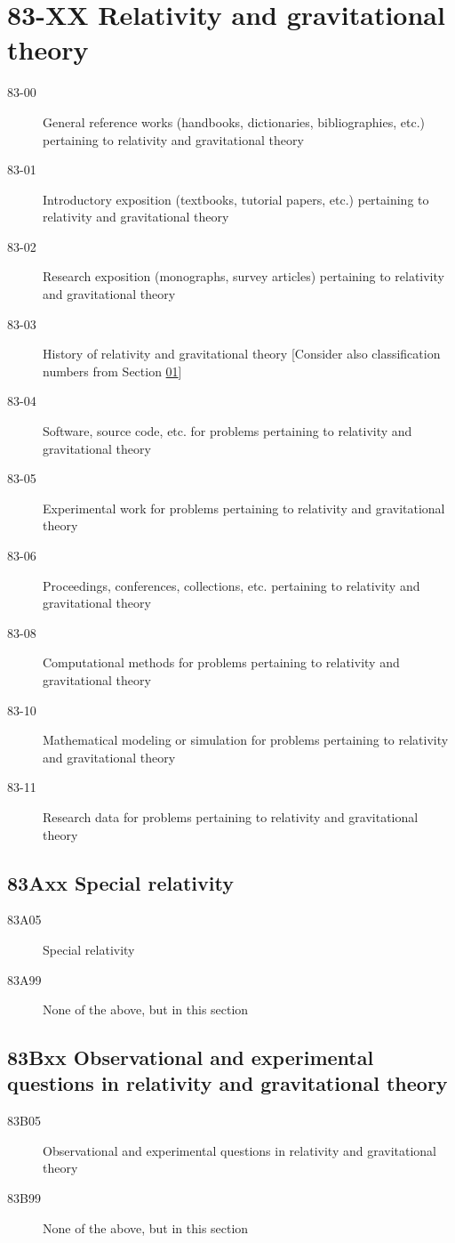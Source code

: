 \section*{83-XX Relativity and gravitational theory }\label{83-XX}
\begin{description}
\item [83-00]\label{83-00} General reference works (handbooks, dictionaries, bibliographies, etc.) pertaining to relativity and gravitational theory
\item [83-01]\label{83-01} Introductory exposition (textbooks, tutorial papers, etc.) pertaining to relativity and gravitational theory
\item [83-02]\label{83-02} Research exposition (monographs, survey articles) pertaining to relativity and gravitational theory
\item [83-03]\label{83-03} History of relativity and gravitational theory [Consider also classification numbers from Section \hyperref[01-XX]{01}]
\item [83-04]\label{83-04} Software, source code, etc. for problems pertaining to relativity and gravitational theory
\item [83-05]\label{83-05} Experimental work for problems pertaining to relativity and gravitational theory
\item [83-06]\label{83-06} Proceedings, conferences, collections, etc. pertaining to relativity and gravitational theory
\item [83-08]\label{83-08} Computational methods for problems pertaining to relativity and gravitational theory
\item [83-10]\label{83-10} Mathematical modeling or simulation for problems pertaining to relativity and gravitational theory
\item [83-11]\label{83-11} Research data for problems pertaining to relativity and gravitational theory
\end{description}
\subsection*{83Axx  Special relativity }\label{83Axx}
\begin{description}  
\item [83A05]\label{83A05} Special relativity
\item [83A99]\label{83A99} None of the above, but in this section
\end{description}
\subsection*{83Bxx  Observational and experimental questions in relativity and gravitational theory }\label{83Bxx}
\begin{description}  
\item [83B05]\label{83B05} Observational and experimental questions in relativity and gravitational theory
\item [83B99]\label{83B99} None of the above, but in this section
\end{description}
